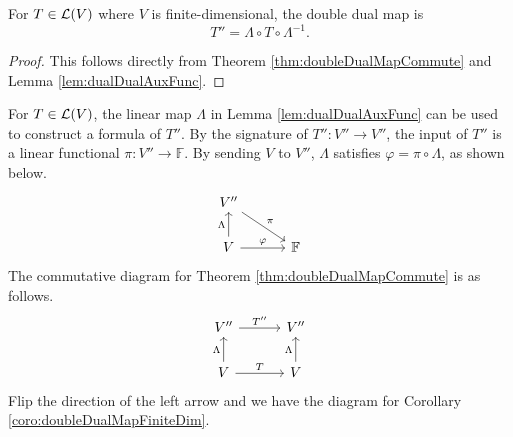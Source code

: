 \begin{coro}
  \label{coro:doubleDualMapFiniteDim}
  For $T\in {\cal L}(V)$ where $V$ is finite-dimensional,
   the double dual map is
   \begin{equation}
     \label{eq:doubleDualMapFiniteDim}
     T'' = \Lambda\circ T \circ \Lambda^{-1}.
   \end{equation}
\end{coro}
\begin{proof}
  This follows directly from Theorem \ref{thm:doubleDualMapCommute}
   and Lemma \ref{lem:dualDualAuxFunc}.
\end{proof}


\begin{rem}
For $T\in {\cal L}(V)$,
   the linear map $\Lambda$ in Lemma \ref{lem:dualDualAuxFunc}
   can be used to construct a formula of $T''$.
  By the signature of $T'':V''\rightarrow V''$,
   the input of $T''$ is a linear functional
   $\pi:V''\rightarrow \mathbb{F}$.
  By sending $V$ to $V''$,
   $\Lambda$ satisfies
   $\varphi = \pi\circ \Lambda$, 
   as shown below.
   \begin{displaymath}
     \begin{tikzcd}[column sep=3em]
       V'' \ar{dr}{\pi} 
       & 
       \\
       V \ar{u}{\Lambda} \ar{r}{\varphi}
       & \mathbb{F}
     \end{tikzcd}
   \end{displaymath}
  The commutative diagram for Theorem \ref{thm:doubleDualMapCommute}
   is as follows.
   \begin{displaymath}
     \begin{tikzcd}[column sep=3em]
       V'' \ar{r}{T''} 
       & V''
       \\
       V \ar{u}{\Lambda} \ar{r}{T}
       & V \ar{u}{\Lambda} 
     \end{tikzcd}
   \end{displaymath}
  Flip the direction of the left arrow
   and we have the diagram for Corollary \ref{coro:doubleDualMapFiniteDim}.
\end{rem}

 


